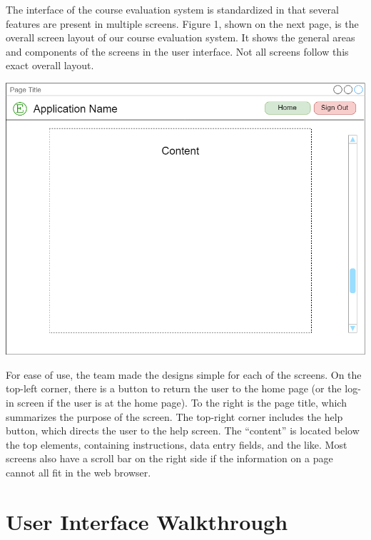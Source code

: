 \documentclass{article}
\begin{document}
The interface of the course evaluation system is standardized in that several features are present in multiple screens. Figure 1, shown on the next page, is the overall screen layout of our course evaluation system. It shows the general areas and components of the screens in the user interface. Not all screens follow this exact overall layout.

\newpage

\begin{center}
\vspace{3mm}
{\includegraphics[scale=0.5]{images/overall_layout.png}}
\vspace{2mm}
\end{center}

For ease of use, the team made the designs simple for each of the screens. On the top-left corner, there is a button to return the user to the home page (or the log-in screen if the user is at the home page). To the right is the page title, which summarizes the purpose of the screen. The top-right corner includes the help button, which directs the user to the help screen. The ``content'' is located below the top elements, containing instructions, data entry fields, and the like. Most screens also have a scroll bar on the right side if the information on a page cannot all fit in the web browser.

\section{User Interface Walkthrough}
\end{document}
